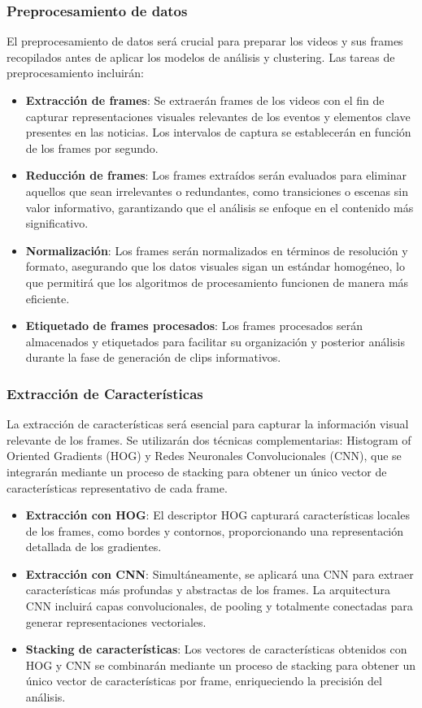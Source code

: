 \subsubsection{Preprocesamiento de datos}
El preprocesamiento de datos será crucial para preparar los videos y sus frames recopilados antes de aplicar los modelos de análisis y clustering. Las tareas de preprocesamiento incluirán:

\begin{itemize}
    \item \textbf{Extracción de frames}: Se extraerán frames de los videos con el fin de capturar representaciones visuales relevantes de los eventos y elementos clave presentes en las noticias. Los intervalos de captura se establecerán en función de los frames por segundo.
    \item \textbf{Reducción de frames}: Los frames extraídos serán evaluados para eliminar aquellos que sean irrelevantes o redundantes, como transiciones o escenas sin valor informativo, garantizando que el análisis se enfoque en el contenido más significativo.
    \item \textbf{Normalización}: Los frames serán normalizados en términos de resolución y formato, asegurando que los datos visuales sigan un estándar homogéneo, lo que permitirá que los algoritmos de procesamiento funcionen de manera más eficiente.
    \item \textbf{Etiquetado de frames procesados}: Los frames procesados serán almacenados y etiquetados para facilitar su organización y posterior análisis durante la fase de generación de clips informativos.
\end{itemize}

\subsubsection{Extracción de Características}
La extracción de características será esencial para capturar la información visual relevante de los frames. Se utilizarán dos técnicas complementarias: Histogram of Oriented Gradients (HOG) y Redes Neuronales Convolucionales (CNN), que se integrarán mediante un proceso de stacking para obtener un único vector de características representativo de cada frame.

\begin{itemize}
    \item \textbf{Extracción con HOG}: El descriptor HOG capturará características locales de los frames, como bordes y contornos, proporcionando una representación detallada de los gradientes.
    \item \textbf{Extracción con CNN}: Simultáneamente, se aplicará una CNN para extraer características más profundas y abstractas de los frames. La arquitectura CNN incluirá capas convolucionales, de pooling y totalmente conectadas para generar representaciones vectoriales.
    \item \textbf{Stacking de características}: Los vectores de características obtenidos con HOG y CNN se combinarán mediante un proceso de stacking para obtener un único vector de características por frame, enriqueciendo la precisión del análisis.
\end{itemize}
